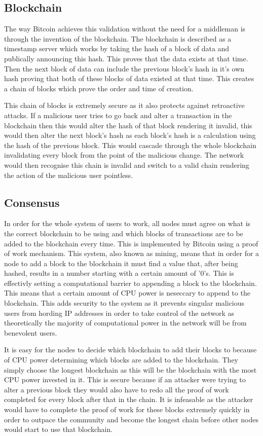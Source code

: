 \documentclass{l4proj}
\begin{document}
\subsection{Blockchain}
The way Bitcoin achieves this validation without the need for a middleman is through the invention of the blockchain.
The blockchain is described as a timestamp server which works by taking the hash of a block of data and publically
announcing this hash. This proves that the data exists at that time. Then the next block of data can include the
previous block's hash in it's own hash proving that both of these blocks of data existed at that time. This creates 
a chain of blocks which prove the order and time of creation.

This chain of blocks is extremely secure as it also protects against retroactive attacks. If a malicious user tries
to go back and alter a transaction in the blockchain then this would alter the hash of that block rendering it invalid,
this would then alter the next block's hash as each block's hash is a calculation using the hash of the previous block.
This would cascade through the whole blockchain invalidating every block from the point of the malicious change. The 
network would then recognise this chain is invalid and switch to a valid chain rendering the action of the malicious
user pointless.

\subsection{Consensus}
In order for the whole system of users to work, all nodes must agree on what is the correct blockchain to be using and
which blocks of transactions are to be added to the blockchain every time. This is implemented by Bitcoin using a proof of
work mechanism. This system, also known as mining, means that in order for a node to add a block to the blockchain it
must find a value that, after being hashed, results in a number starting with a certain amount of '0's. This is 
effectivly setting a computational barrier to appending a block to the blockchain. This means that a certain amount of
CPU power is neseccary to append to the blockchain. This adds security to the system as it prevents singular malicious
users from hording IP addresses in order to take control of the network as theoretically the majority of computational
power in the network will be from benevolent users.


It is easy for the nodes to decide which blockchain to add their blocks to because of CPU power
determining which blocks are added to the blockchain. They simply choose the longest blockchain as this will be
the blockchain with the most CPU power invested in it. This is secure because if an attacker were trying to alter a 
previous block they would also have to redo all the proof of work completed for every block after that in the chain.
It is infeasable as the attacker would have to complete the proof of work for these blocks extremely quickly in order
to outpace the community and become the longest chain before other nodes would start to use that blockchain.
\end{document}
